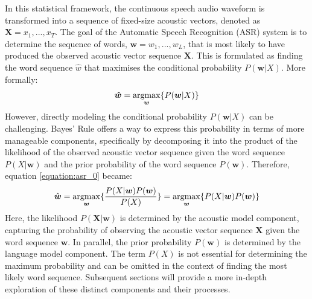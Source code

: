 In this statistical framework, the continuous speech audio waveform is transformed into a sequence of fixed-size acoustic vectors, denoted as $\boldsymbol{X}=x_1,...,x_T$. The goal of the Automatic Speech Recognition (ASR) system is to determine the sequence of words, $\boldsymbol{w}=w_1,...,w_L$ ​, that is most likely to have produced the observed acoustic vector sequence $\boldsymbol{X}$. This is formulated as finding the word sequence $\hat{w}$ that maximises the conditional probability $P(\boldsymbol{w}|X)$. More formally:
\begin{equation} \label{equation:asr_0}
    \boldsymbol{\hat{w}} = \operatorname*{argmax}_{\boldsymbol{w}} \{P(\boldsymbol{w}|X)\}
\end{equation}
However, directly modeling the conditional probability $P(\boldsymbol{w}|X)$ can be challenging. Bayes' Rule offers a way to express this probability in terms of more manageable components, specifically by decomposing it into the product of the likelihood of the observed acoustic vector sequence given the word sequence $P(X|\boldsymbol{w})$ and the prior probability of the word sequence $P(\boldsymbol{w})$. Therefore, equation \ref{equation:asr_0} became:
\begin{equation}  \label{equation:asr}
    \hat{\boldsymbol{w}} = \operatorname*{argmax}_{\boldsymbol{w}} \{\frac{P(X|\boldsymbol{w})P(\boldsymbol{w})}{P(X)}\} =\operatorname*{argmax}_{\boldsymbol{w}} \{P(X|\boldsymbol{w})P(\boldsymbol{w})\}
\end{equation}
Here,  the likelihood $P(\boldsymbol{X}|\boldsymbol{w})$ is determined by the acoustic model component, capturing the probability of observing the acoustic vector sequence $\boldsymbol{X}$ given the word sequence $\boldsymbol{w}$. In parallel,  the prior probability $P(\boldsymbol{w})$ is determined by the language model component. The term $P(X)$ is not essential for determining the maximum probability and can be omitted in the context of finding the most likely word sequence. Subsequent sections will provide a more in-depth exploration of these distinct components and their processes.

